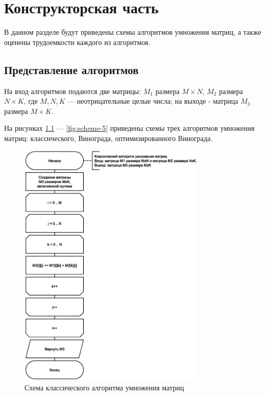 \chapter{Конструкторская часть}
В данном разделе будут приведены схемы алгоритмов умножения матриц, а также оценены трудоемкости каждого из алгоритмов.

\section{Представление алгоритмов}

На вход алгоритмов подаются две матрицы: $M_{1}$ размера $M \times N$, $M_{2}$ размера $N \times K$, где $M, N, K$ --- неотрицательные целые числа; на выходе - матрица $M_{3}$ размера $M \times K$.

На рисунках \ref{fig:scheme-1} --- \ref{fig:scheme-5} приведены схемы трех алгоритмов умножения матриц: классического, Винограда, оптимизированного Винограда.

\clearpage

\begin{figure}[h]
    \centering
    \includegraphics[width=0.8\textwidth]{images/schemes/std_mult.eps}
    \caption{Схема классического алгоритма умножения матриц}
    \label{fig:scheme-1}
\end{figure}

